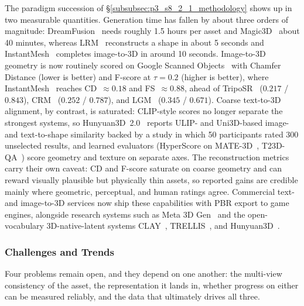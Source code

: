 The paradigm succession of §\ref{subsubsec:p3_s8_2_1_methodology} shows up in two measurable quantities.
Generation time has fallen by about three orders of magnitude: DreamFusion~\cite{poole2022dreamfusion} needs roughly 1.5 hours per asset and Magic3D~\cite{lin2023magic3d} about 40 minutes, whereas LRM~\cite{hong2023lrm} reconstructs a shape in about 5 seconds and InstantMesh~\cite{xu2024instantmesh} completes image-to-3D in around 10 seconds.
Image-to-3D geometry is now routinely scored on Google Scanned Objects~\cite{downs2022googleGSO} with Chamfer Distance (lower is better) and F-score at $\tau{=}0.2$ (higher is better), where InstantMesh~\cite{xu2024instantmesh} reaches CD~$\approx 0.18$ and FS~$\approx 0.88$, ahead of TripoSR~\cite{tochilkin2024triposr} ($0.217$ / $0.843$), CRM~\cite{wang2024crm} ($0.252$ / $0.787$), and LGM~\cite{tang2024lgm} ($0.345$ / $0.671$).
Coarse text-to-3D alignment, by contrast, is saturated: CLIP-style scores no longer separate the strongest systems, so Hunyuan3D~2.0~\cite{hunyuan3d22025tencent} reports ULIP- and Uni3D-based image- and text-to-shape similarity backed by a study in which 50 participants rated 300 unselected results, and learned evaluators (HyperScore on MATE-3D~\cite{zhang2025mate3d}, T23D-QA~\cite{li2025t23d}) score geometry and texture on separate axes.
The reconstruction metrics carry their own caveat: CD and F-score saturate on coarse geometry and can reward visually plausible but physically thin assets, so reported gains are credible mainly where geometric, perceptual, and human ratings agree.
Commercial text- and image-to-3D services now ship these capabilities with PBR export to game engines, alongside research systems such as Meta 3D Gen~\cite{bensadoun2024meta3dgen} and the open-vocabulary 3D-native-latent systems CLAY~\cite{zhang2024clay}, TRELLIS~\cite{xiang2025trellis}, and Hunyuan3D~\cite{yang2024hunyuan3d, hunyuan3d22025tencent}.


\subsubsection{Challenges and Trends}
\label{subsubsec:p3_s8_2_1_challenges}

Four problems remain open, and they depend on one another: the multi-view consistency of the asset, the representation it lands in, whether progress on either can be measured reliably, and the data that ultimately drives all three.


